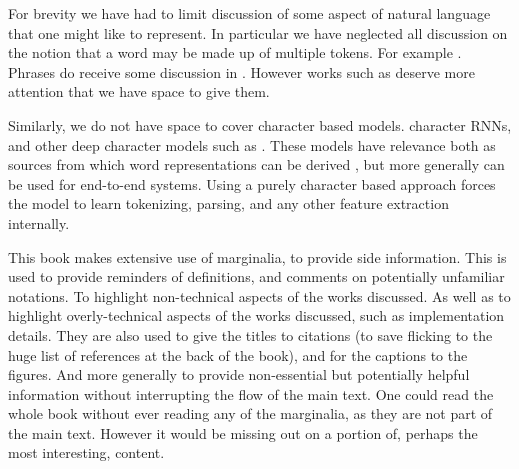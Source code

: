 \documentclass[12pt,parskip]{komatufte}
\begin{document}
For brevity we have had to limit discussion of some aspect of natural language that one might like to represent.
In particular we have neglected all discussion on the notion that a word may be made up of multiple tokens.
For example .
Phrases do receive some discussion in .
However works such as  deserve more attention that we have space to give them.

Similarly, we do not have space to cover character based models.
character RNNs, and other deep character models such as .
These models have relevance both as sources from which word representations can be derived ,
but more generally can be used for end-to-end systems.
Using a purely character based approach forces the model to learn tokenizing, parsing, and any other feature extraction internally.



This book makes extensive use of marginalia, to provide side information.
This is used to provide reminders of definitions, and comments on potentially unfamiliar notations.
To highlight non-technical aspects of the works discussed.
As well as to highlight overly-technical aspects of the works discussed, such as implementation details.
They are also used to give the titles to citations (to save flicking to the huge list of references at the back of the book), and for the captions to the figures.
And more generally to provide non-essential  but potentially helpful information without interrupting the flow of the main text.
One could read the whole book without ever reading any of the marginalia,
as they are not part of the main text.
However it would be missing out on a portion of, perhaps the most interesting, content.
\end{document}
